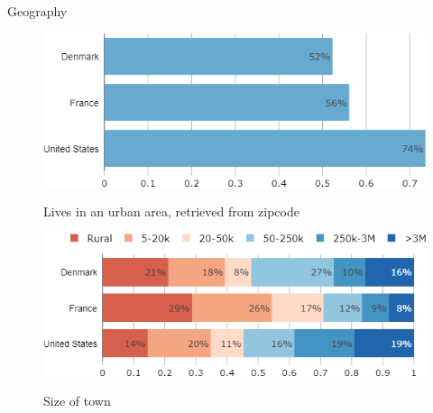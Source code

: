 \documentclass[aspectratio=169,9pt,dvipsnames]{beamer}
\begin{document}
\begin{frame}{Geography}%
\begin{figure}[h!]
\centering
\caption{Lives in an urban area, retrieved from zipcode}
\includegraphics[width=.5\textwidth]{../figures/country_comparison/urban_countries.png} \\
\vspace{.2cm}
\end{figure}

\begin{figure}[h!]
\centering
\caption{Size of town}
\includegraphics[width=.5\textwidth]{../figures/country_comparison/urbanity_countries.png} \\
\vspace{.2cm}
\end{figure}

\end{frame}

\end{document}
